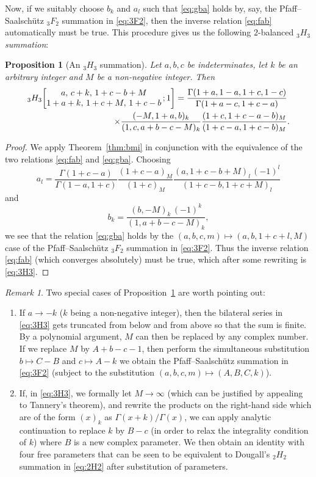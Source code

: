 \documentclass[reqno,12pt]{amsart}
\newtheorem{proposition}{Proposition}
\theoremstyle{remark}
\newtheorem{remark}{Remark}
\numberwithin{equation}{section}
\newcommand{\Ga}{\Gamma}
\begin{document}
Now, if we suitably choose $b_k$ and $a_l$ such that \eqref{eq:gba}
holds by, say, the Pfaff--Saalsch\"utz ${}_3F_2$ summation in \eqref{eq:3F2},
then the inverse relation \eqref{eq:fab}
automatically must be true. This procedure gives
us the following $2$-balanced \textit{${}_3H_3$ summation}:
\begin{proposition}[An $_3H_3$ summation]\label{prop:3H3}
  Let $a,b,c$ be indeterminates, let $k$ be an arbitrary integer and $M$
  be a non-negative integer. Then
\begin{align}\label{eq:3H3}
{}_3H_3\!\left[\begin{matrix}a,\,c+k,\,1+c-b+M\\
1+a+k,\,1+c+M,\,1+c-b\end{matrix}\,;1\right]=
\frac{\Ga(1+a,1-a,1+c,1-c)}
{\Ga(1+a-c,1+c-a)}&\notag\\
\times\frac{(-M,1+a,b)_k}{(1,c,a+b-c-M)_k}
\frac{(1+c,1+c-a-b)_M}{(1+c-a,1+c-b)_M}&.
\end{align}
\end{proposition}
\begin{proof}
We apply Theorem~\ref{thm:bmi} in conjunction with the equivalence
of the two relations \eqref{eq:fab} and \eqref{eq:gba}.
Choosing
$$
a_l=\frac{\Ga(1+c-a)}{\Ga(1-a,1+c)}\frac{(1+c-a)_M}{(1+c)_M}
\frac{(a,1+c-b+M)_l\,(-1)^l}{(1+c-b,1+c+M)_l}
$$
and
$$
b_k=\frac{(b,-M)_k\,(-1)^k}{(1,a+b-c-M)_k},
$$
we see that the relation \eqref{eq:gba} holds by the
$(a,b,c,m)\mapsto(a,b,1+c+l,M)$ case of the
Pfaff--Saalsch\"utz ${}_3F_2$ summation in \eqref{eq:3F2}.
Thus the inverse relation \eqref{eq:fab} (which converges absolutely)
must be true, which after some rewriting is \eqref{eq:3H3}.
\end{proof}
\begin{remark}\label{rem:2l}
Two special cases of Proposition~\ref{prop:3H3} are worth pointing out:
\begin{enumerate}
\item
  If $a\to -k$ ($k$ being a non-negative integer),
  then the bilateral series in \eqref{eq:3H3}
gets truncated from below and from above so that the sum is finite. By
a polynomial argument, $M$ can then be replaced by any complex number.
If we replace $M$ by $A+b-c-1$, then perform the simultaneous substitution
$b\mapsto C-B$ and $c\mapsto A-k$ we obtain the
Pfaff--Saalsch\"utz summation in \eqref{eq:3F2}
(subject to the substitution $(a,b,c,m)\mapsto(A,B,C,k)$).

\item
  If, in \eqref{eq:3H3}, we formally let $M\to\infty$
  (which can be justified by appealing to Tannery's theorem),
  and rewrite the products on the right-hand side which are of the
  form $(x)_k$ as $\Ga(x+k)/\Ga(x)$, we can apply analytic continuation
to replace $k$ by $B-c$ (in order to relax the integrality condition
of $k$) where $B$ is a new complex parameter. We then obtain
an identity with four free parameters that can be seen to be
equivalent to Dougall's ${}_2H_2$ summation in \eqref{eq:2H2}
after substitution of parameters.
\end{enumerate}
\end{remark}
\end{document}
